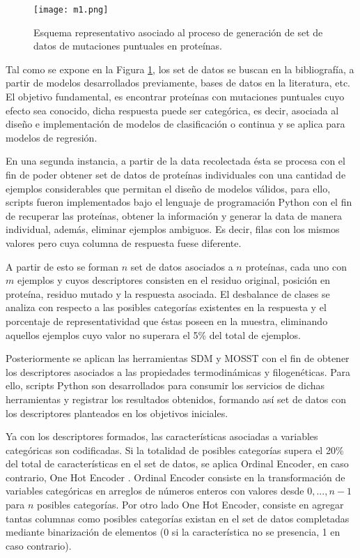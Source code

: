 \begin{figure}[!h]
	\centering
	\texttt{[image: m1.png]}
	\caption{Esquema representativo asociado al proceso de generación de set de datos de mutaciones puntuales en proteínas.}
	\label{C2:M1}
\end{figure}

Tal como se expone en la Figura \ref{C2:M1}, los set de datos se buscan en la bibliografía, a partir de modelos desarrollados previamente, bases de datos en la literatura, etc. El objetivo fundamental, es encontrar proteínas con mutaciones puntuales cuyo efecto sea conocido, dicha respuesta puede ser categórica, es decir, asociada al diseño e implementación de modelos de clasificación o continua y se aplica para modelos de regresión. 

En una segunda instancia, a partir de la data recolectada ésta se procesa con el fin de poder obtener set de datos de proteínas individuales con una cantidad de ejemplos considerables que permitan el diseño de modelos válidos, para ello, scripts fueron implementados bajo el lenguaje de programación Python con el fin de recuperar las proteínas, obtener la información y generar la data de manera individual, además, eliminar ejemplos ambiguos. Es decir, filas con los mismos valores pero cuya columna de respuesta fuese diferente. 

A partir de esto se forman $n$ set de datos asociados a $n$ proteínas, cada uno con $m$ ejemplos y cuyos descriptores consisten en el residuo original, posición en proteína, residuo mutado y la respuesta asociada. El desbalance de clases se analiza con respecto a las posibles categorías existentes en la respuesta y el porcentaje de representatividad que éstas poseen en la muestra, eliminando aquellos ejemplos cuyo valor no superara el 5\% del total de ejemplos.

Posteriormente se aplican las herramientas SDM \cite{Pandurangan2017} y MOSST \cite{Olivera-Nappa2011} con el fin de obtener los descriptores asociados a las propiedades termodinámicas y filogenéticas. Para ello, scripts Python son desarrollados para consumir los servicios de dichas herramientas y registrar los resultados obtenidos, formando así set de datos con los descriptores planteados en los objetivos iniciales.

Ya con los descriptores formados, las características asociadas a variables categóricas son codificadas. Si la totalidad de posibles categorías supera el 20\% del total de características en el set de datos, se aplica Ordinal Encoder, en caso contrario, One Hot Encoder \cite{pedregosa2011scikit}. Ordinal Encoder consiste en la transformación de variables categóricas en arreglos de números enteros con valores desde $0,...,n-1$ para $n$ posibles categorías. Por otro lado One Hot Encoder, consiste en agregar tantas columnas como posibles categorías existan en el set de datos completadas mediante binarización de elementos (0 si la característica no se presencia, 1 en caso contrario).

